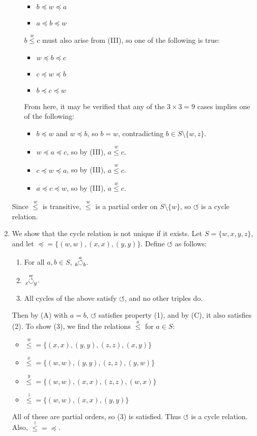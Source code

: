 \documentclass{article}
\newcommand{\ternary}[4]{\hspace{-1mm}\tensor[_{#3}]{\overset{#2}{#1}}{_{#4}}}
\newcommand{\cyc}[3]{\ternary{\circlearrowleft}{#1}{#2}{#3}}
\newcommand{\po}[1]{\overset{#1}{\leq}}
\begin{document}
\begin{enumerate}[label=(\roman*)]
\begin{itemize}
\begin{itemize}
    \item $b \preceq w \preceq a$
    \item $a \preceq b \preceq w$
    \end{itemize}
    $b \po{w} c$ must also arise from (III),
    so one of the following is true:
    \begin{itemize}
    \item $w \preceq b \preceq c$
    \item $c \preceq w \preceq b$
    \item $b \preceq c \preceq w$
    \end{itemize}
    From here, it may be verified
    that any of the $3 \times 3 = 9$ cases
    implies one of the following:
    \begin{itemize}
    \item
      $b \preceq w$ and $w \preceq b$,
      so $b = w$, contradicting $b \in S \setminus \{w, z\}$.
    \item $w \preceq a \preceq c$, so by (III), $a \po{w} c$.
    \item $c \preceq w \preceq a$, so by (III), $a \po{w} c$.
    \item $a \preceq c \preceq w$, so by (III), $a \po{w} c$.
    \end{itemize}
  \end{itemize}
  Since $\po{w}$ is transitive,
  $\po{w}$ is a partial order on $S \setminus \{w\}$,
  so $\circlearrowleft$ is a cycle relation.
  
  \newpage

\item
  We show that the cycle relation is not unique if it exists.
  Let $S = \{w, x, y, z\}$,
  and let $\preceq = \{(w, w), (x, x), (y, y)\}$.
  Define $\circlearrowleft$ as follows:
  \begin{enumerate}[label=(\Alph*)]
  \item
    For all $a, b \in S$, $\cyc{a}{b}{b}$.
  \item
    $\cyc{w}{x}{y}$.
  \item
    All cycles of the above satisfy $\circlearrowleft$,
    and no other triples do.
  \end{enumerate}
  Then by (A) with $a = b$, $\circlearrowleft$ satisfies property (1),
  and by (C), it also satisfies (2).
  To show (3), we find the relations $\po{a}$ for $a \in S$:
  \begin{itemize}
  \item $\po{w} = \{(x, x), (y, y), (z, z), (x, y)\}$
  \item $\po{x} = \{(w, w), (y, y), (z, z), (y, w)\}$
  \item $\po{y} = \{(w, w), (x, x), (z, z), (w, x)\}$
  \item $\po{z} = \{(w, w), (x, x), (y, y)\}$
  \end{itemize}
  All of these are partial orders, so (3) is satisfied.
  Thus $\circlearrowleft$ is a cycle relation.
  Also, $\po{z} = \preceq$.


\end{enumerate}
\end{document}
